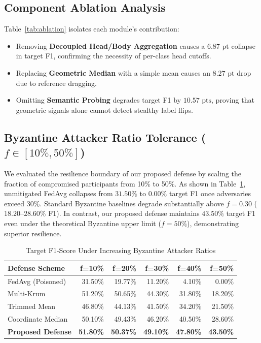 \documentclass[conference]{IEEEtran}
\begin{document}
\subsection{Component Ablation Analysis}
Table~\ref{tab:ablation} isolates each module's contribution:
\begin{itemize}
    \item Removing \textbf{Decoupled Head/Body Aggregation} causes a $6.87\text{ pt}$ collapse in target F1, confirming the necessity of per-class head cutoffs.
    \item Replacing \textbf{Geometric Median} with a simple mean causes an $8.27\text{ pt}$ drop due to reference dragging.
    \item Omitting \textbf{Semantic Probing} degrades target F1 by $10.57\text{ pts}$, proving that geometric signals alone cannot detect stealthy label flips.
\end{itemize}

\subsection{Byzantine Attacker Ratio Tolerance ($f \in [10\%, 50\%]$)}
We evaluated the resilience boundary of our proposed defense by scaling the fraction of compromised participants from 10\% to 50\%. As shown in Table~\ref{tab:byzantine_tolerance}, unmitigated FedAvg collapses from $31.50\%$ to $0.00\%$ target F1 once adversaries exceed 30\%. Standard Byzantine baselines degrade substantially above $f = 0.30$ ($18.20\text{--}28.60\%$ F1). In contrast, our proposed defense maintains $43.50\%$ target F1 even under the theoretical Byzantine upper limit ($f = 50\%$), demonstrating superior resilience.

\begin{table}[t]
\caption{Target F1-Score Under Increasing Byzantine Attacker Ratios}
\label{tab:byzantine_tolerance}
\centering
\begin{tabular}{@{}lrrrrr@{}}
\toprule
\textbf{Defense Scheme} & \textbf{f=10\%} & \textbf{f=20\%} & \textbf{f=30\%} & \textbf{f=40\%} & \textbf{f=50\%} \\
\midrule
FedAvg (Poisoned) & 31.50\% & 19.77\% & 11.20\% & 4.10\% & 0.00\% \\
Multi-Krum & 51.20\% & 50.65\% & 44.30\% & 31.80\% & 18.20\% \\
Trimmed Mean & 46.80\% & 44.13\% & 41.50\% & 34.20\% & 21.50\% \\
Coordinate Median & 50.10\% & 49.43\% & 46.20\% & 40.50\% & 28.60\% \\
\textbf{Proposed Defense} & \textbf{51.80\%} & \textbf{50.37\%} & \textbf{49.10\%} & \textbf{47.80\%} & \textbf{43.50\%} \\
\bottomrule
\end{tabular}
\end{table}
\end{document}
